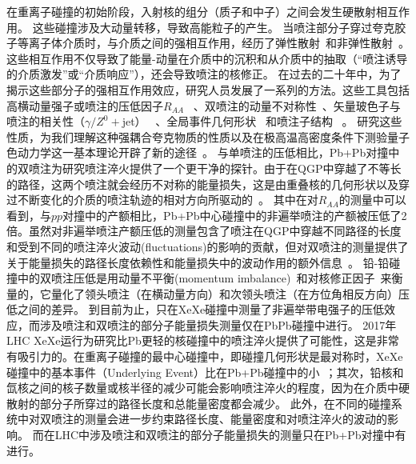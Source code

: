 	在重离子碰撞的初始阶段，入射核的组分（质子和中子）之间会发生硬散射相互作用。
	这些碰撞涉及大动量转移，导致高能粒子的产生。
	当喷注部分子穿过夸克胶子等离子体介质时，与介质之间的强相互作用，经历了弹性散射~\parencite{bjorken1982fermilab,braaten1991energy,Djordjevic:2006tw,Qin:2007rn}和非弹性散射~\parencite{Baier:1996kr,Zakharov:1996fv,Gyulassy:1999zd,Wiedemann:2000za,Arnold:2002ja,Wang:2001ifa}。
	这些相互作用不仅导致了能量-动量在介质中的沉积和从介质中的抽取（“喷注诱导的介质激发”或“介质响应”），还会导致喷注的核修正。
	在过去的二十年中，为了揭示这些部分子的强相互作用效应，研究人员发展了一系列的方法。这些工具包括高横动量强子或喷注的压低因子$R_{AA}$ ~\parencite{ATLAS:2014ipv,Wang:1998bha,Bass:2008rv,Wang:2002ri,JETSCAPE:2021ehl,He:2018xjv}、双喷注的动量不对称性~\parencite{ATLAS:2010isq,Zhang:2007ja,Qin:2010mn,Kang:2018wrs,Fialkovsky:2011pu}、矢量玻色子与喷注的相关性（$\gamma/Z^0 +$jet） ~\parencite{CMS:2012ytf,Neufeld:2010fj,Dai:2012am,Huang:2015mva,Yang:2022nei,Chen:2020tbl}、全局事件几何形状 ~\parencite{Chen:2020pfa,Kang:2023qxb}和喷注子结构 ~\parencite{CMS:2013lhm,Vitev:2009rd,Vitev:2008rz,Zhang:2021sua,Chen:2022kic,Zhang:2018urd,Wang:2023eer,JETSCAPE:2023hqn}。
	研究这些性质，为我们理解这种强耦合夸克物质的性质以及在极高温高密度条件下测验量子色动力学这一基本理论开辟了新的途径~\parencite{Xie:2022ght,Zhang:2021xib,JETSCAPE:2020mzn,Tang:2020ame}。
	与单喷注的压低相比，Pb+Pb对撞中的双喷注为研究喷注淬火提供了一个更干净的探针。由于在QGP中穿越了不等长的路径，这两个喷注就会经历不对称的能量损失，这是由重叠核的几何形状以及穿过不断变化的介质的喷注轨迹的相对方向所驱动的~\parencite{Qin:2010mn}。
	 其中在对$R_{AA}$的测量中可以看到，与$pp$对撞中的产额相比，Pb+Pb中心碰撞中的非遍举喷注的产额被压低了2倍。虽然对非遍举喷注产额压低的测量包含了喷注在QGP中穿越不同路径的长度和受到不同的喷注淬火波动(fluctuations)的影响的贡献，但对双喷注的测量提供了关于能量损失的路径长度依赖性和能量损失中的波动作用的额外信息~\parencite{Qin:2010mn, Milhano:2015mng}。
	铅-铅碰撞中的双喷注压低是用动量不平衡(momentum imbalance)~\parencite{CMS:2012ulu, ATLAS:2017xfa, ATLAS:2022zbu}和对核修正因子~\parencite{ATLAS:2022zbu}来衡量的，它量化了领头喷注（在横动量方向）和次领头喷注（在方位角相反方向）压低之间的差异。
	到目前为止，只在XeXe碰撞中测量了非遍举带电强子的压低效应，而涉及喷注和双喷注的部分子能量损失测量仅在PbPb碰撞中进行。
	2017年LHC XeXe运行为研究比Pb更轻的核碰撞中的喷注淬火提供了可能性，这是非常有吸引力的。在重离子碰撞的最中心碰撞中，即碰撞几何形状是最对称时，XeXe碰撞中的基本事件（Underlying Event）比在Pb+Pb碰撞中的小~\parencite{ATLAS:2022kqu, CMS:2018yyx, ALICE:2018hza}；其次，铅核和氙核之间的核子数量或核半径的减少可能会影响喷注淬火的程度，因为在介质中硬散射的部分子所穿过的路径长度和总能量密度都会减少。
	此外，在不同的碰撞系统中对双喷注的测量会进一步约束路径长度、能量密度和对喷注淬火的波动的影响。
	而在LHC中涉及喷注和双喷注的部分子能量损失的测量只在Pb+Pb对撞中有进行。



